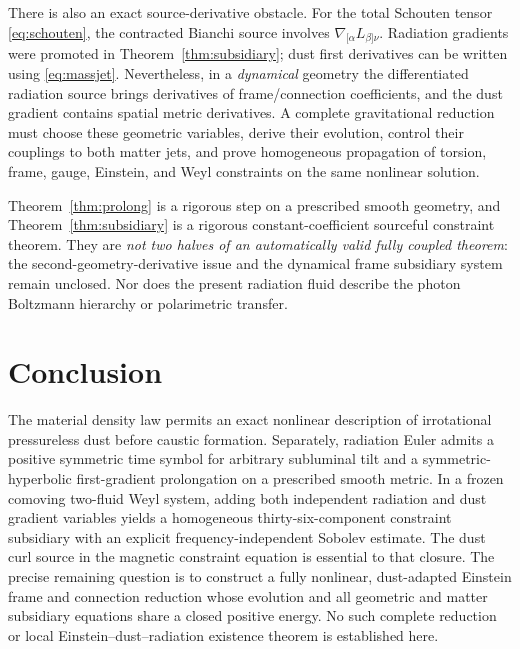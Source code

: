 \documentclass[10pt,a4paper]{article}
\begin{document}
There is also an exact source-derivative obstacle. For the total Schouten tensor \eqref{eq:schouten}, the contracted Bianchi source involves $\nabla_{[\alpha}L_{\beta]\nu}$. Radiation gradients were promoted in Theorem~\ref{thm:subsidiary}; dust first derivatives can be written using \eqref{eq:massjet}. Nevertheless, in a \emph{dynamical} geometry the differentiated radiation source brings derivatives of frame/connection coefficients, and the dust gradient contains spatial metric derivatives. A complete gravitational reduction must choose these geometric variables, derive their evolution, control their couplings to both matter jets, and prove homogeneous propagation of torsion, frame, gauge, Einstein, and Weyl constraints on the same nonlinear solution.

Theorem~\ref{thm:prolong} is a rigorous step on a prescribed smooth geometry, and Theorem~\ref{thm:subsidiary} is a rigorous constant-coefficient sourceful constraint theorem. They are \emph{not two halves of an automatically valid fully coupled theorem}: the second-geometry-derivative issue and the dynamical frame subsidiary system remain unclosed. Nor does the present radiation fluid describe the photon Boltzmann hierarchy or polarimetric transfer.

\section{Conclusion}
The material density law permits an exact nonlinear description of irrotational pressureless dust before caustic formation. Separately, radiation Euler admits a positive symmetric time symbol for arbitrary subluminal tilt and a symmetric-hyperbolic first-gradient prolongation on a prescribed smooth metric. In a frozen comoving two-fluid Weyl system, adding both independent radiation and dust gradient variables yields a homogeneous thirty-six-component constraint subsidiary with an explicit frequency-independent Sobolev estimate. The dust curl source in the magnetic constraint equation is essential to that closure. The precise remaining question is to construct a fully nonlinear, dust-adapted Einstein frame and connection reduction whose evolution and all geometric and matter subsidiary equations share a closed positive energy. No such complete reduction or local Einstein--dust--radiation existence theorem is established here.

\appendix
\end{document}
